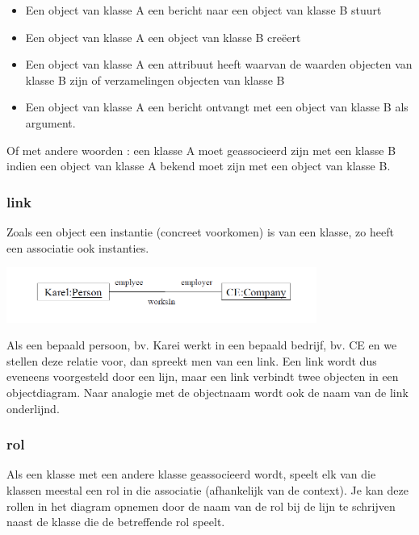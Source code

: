 \begin{itemize}
    \item Een object van klasse A een bericht naar een object van klasse B stuurt
    \item Een object van klasse A een object van klasse B creëert
    \item Een object van klasse A een attribuut heeft waarvan de waarden objecten van klasse B zijn of verzamelingen objecten van klasse B
    \item Een object van klasse A een bericht ontvangt met een object van klasse B als argument.
\end{itemize}

Of met andere woorden : een klasse A moet geassocieerd zijn met een klasse B indien een object van klasse A bekend moet zijn met een object van klasse B.

\subsubsection{link}

Zoals een object een instantie (concreet voorkomen) is van een klasse, zo heeft een associatie ook instanties.


\begin{center}
\includegraphics[width=4in]{img/link1}%
\end{center}

Als een bepaald persoon, bv. Karei werkt in een bepaald bedrijf, bv. CE en we stellen deze relatie voor, dan spreekt men van een link. Een link wordt dus eveneens voorgesteld door een lijn, maar een link verbindt twee objecten in een objectdiagram.
Naar analogie met de objectnaam wordt ook de naam van de link onderlijnd.

\subsubsection{rol}

Als een klasse met een andere klasse geassocieerd wordt, speelt elk van die klassen meestal een rol in die associatie (afhankelijk van de context). Je kan deze rollen in het diagram opnemen door de naam van de rol bij de lijn te schrijven naast de klasse die de betreffende rol speelt.

